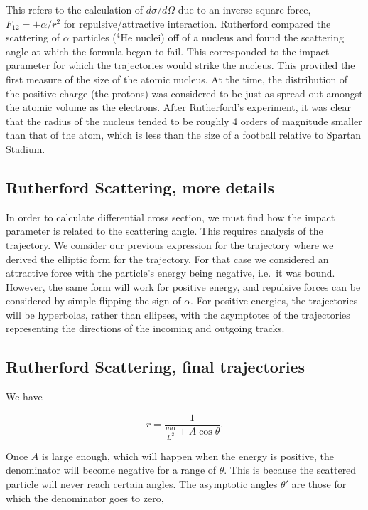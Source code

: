 \documentclass[%
oneside,                 %
final,                   %
10pt]{article}
\begin{document}
This refers to the calculation of $d\sigma/d\Omega$ due to an inverse
square force, $F_{12}=\pm\alpha/r^2$ for repulsive/attractive
interaction. Rutherford compared the scattering of $\alpha$ particles
($^4$He nuclei) off of a nucleus and found the scattering angle at
which the formula began to fail. This corresponded to the impact
parameter for which the trajectories would strike the nucleus. This
provided the first measure of the size of the atomic nucleus. At the
time, the distribution of the positive charge (the protons) was
considered to be just as spread out amongst the atomic volume as the
electrons. After Rutherford's experiment, it was clear that the radius
of the nucleus tended to be roughly 4 orders of magnitude smaller than
that of the atom, which is less than the size of a football relative
to Spartan Stadium.

\subsection*{Rutherford Scattering, more details}

In order to calculate differential cross section, we must find how the
impact parameter is related to the scattering angle. This requires
analysis of the trajectory. We consider our previous expression for
the trajectory where we derived the elliptic form for the trajectory,
For that case we considered an attractive
force with the particle's energy being negative, i.e.~it was
bound. However, the same form will work for positive energy, and
repulsive forces can be considered by simple flipping the sign of
$\alpha$. For positive energies, the trajectories will be hyperbolas,
rather than ellipses, with the asymptotes of the trajectories
representing the directions of the incoming and outgoing
tracks.

\subsection*{Rutherford Scattering, final trajectories}

We have

\begin{equation}\label{eq:ruthtraj}
r=\frac{1}{\frac{m\alpha}{L^2}+A\cos\theta}.
\end{equation}

Once $A$ is large enough, which will happen when the energy is
positive, the denominator will become negative for a range of
$\theta$. This is because the scattered particle will never reach
certain angles. The asymptotic angles $\theta'$ are those for which
the denominator goes to zero,
\end{document}
